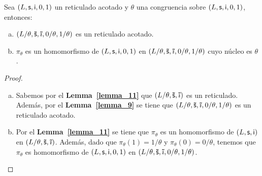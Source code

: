   \begin{lemma} \label{lemma_15}
    \PN Sea $(L, \mathsf{s}, \mathsf{i}, 0, 1)$ un reticulado acotado y $\theta$ una congruencia sobre $(L, \mathsf{s}, \mathsf{i}, 0, 1)$, entonces:
    \begin{enumerate}[a)]
      \item $(L/\theta, \mathsf{\tilde{s}}, \mathsf{\tilde{\imath}}, 0/\theta, 1/\theta)$ es un reticulado acotado.
      \item $\pi_{\theta}$ es un homomorfismo de $(L, \mathsf{s}, \mathsf{i}, 0, 1)$ en $(L/\theta, \mathsf{\tilde{s}}, \mathsf{\tilde{\imath}}, 0/\theta, 1/\theta)$ cuyo núcleo es $\theta$.
    \end{enumerate}
  \end{lemma}
  \begin{proof}
    \PN \newline
    \begin{enumerate}[a)]
      \item Sabemos por el \textbf{Lemma~\ref{lemma_11}} que $(L/\theta, \mathsf{\tilde{s}}, \mathsf{\tilde{\imath}})$ es un reticulado. Además, por el
      \textbf{Lemma~\ref{lemma_9}} se tiene que $(L/\theta, \mathsf{\tilde{s}}, \mathsf{\tilde{\imath}}, 0/\theta, 1/\theta)$ es un reticulado acotado.
      \item Por el \textbf{Lemma~\ref{lemma_11}} se tiene que $\pi_{\theta}$ es un homomorfismo de $(L, \mathsf{s}, \mathsf{i})$ en
      $(L/\theta, \mathsf{\tilde{s}}, \mathsf{\tilde{\imath}})$. Además, dado que $\pi_{\theta}(1) = 1/\theta$ y $\pi_{\theta}(0) = 0/\theta$, tenemos que
      $\pi_{\theta}$ es homomorfismo de $(L, \mathsf{s}, \mathsf{i}, 0, 1)$ en $(L/\theta, \mathsf{\tilde{s}}, \mathsf{\tilde{\imath}}, 0/\theta, 1/\theta)$.
    \end{enumerate}
  \end{proof}

